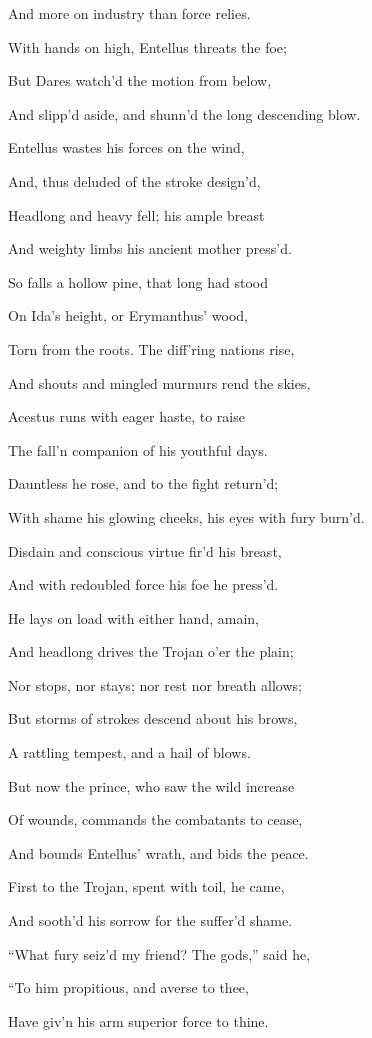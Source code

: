And more on industry than force relies.

With hands on high, Entellus threats the foe;

But Dares watch’d the motion from below,

And slipp’d aside, and shunn’d the long descending blow.

Entellus wastes his forces on the wind,

And, thus deluded of the stroke design’d,

Headlong and heavy fell; his ample breast

And weighty limbs his ancient mother press’d.

So falls a hollow pine, that long had stood

On Ida’s height, or Erymanthus’ wood,

Torn from the roots. The diff’ring nations rise,

And shouts and mingled murmurs rend the skies,

Acestus runs with eager haste, to raise

The fall’n companion of his youthful days.

Dauntless he rose, and to the fight return’d;

With shame his glowing cheeks, his eyes with fury burn’d.

Disdain and conscious virtue fir’d his breast,

And with redoubled force his foe he press’d.

He lays on load with either hand, amain,

And headlong drives the Trojan o’er the plain;

Nor stops, nor stays; nor rest nor breath allows;

But storms of strokes descend about his brows,

A rattling tempest, and a hail of blows.

But now the prince, who saw the wild increase

Of wounds, commands the combatants to cease,

And bounds Entellus’ wrath, and bids the peace.

First to the Trojan, spent with toil, he came,

And sooth’d his sorrow for the suffer’d shame.

“What fury seiz’d my friend? The gods,” said he,

“To him propitious, and averse to thee,

Have giv’n his arm superior force to thine.

